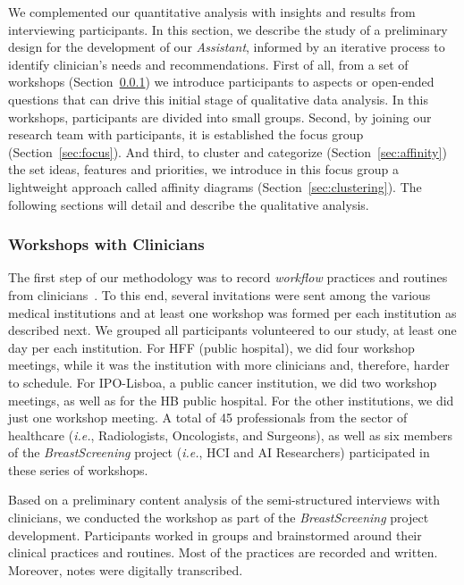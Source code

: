 We complemented our quantitative analysis with insights and results from interviewing participants.
In this section, we describe the study of a preliminary design for the development of our {\it Assistant}, informed by an iterative process to identify clinician's needs and recommendations.
First of all, from a set of workshops (Section~\ref{sec:workshops}) we introduce participants to aspects or open-ended questions that can drive this initial stage of qualitative data analysis.
In this workshops, participants are divided into small groups.
Second, by joining our research team with participants, it is established the focus group (Section~\ref{sec:focus}).
And third, to cluster and categorize (Section~\ref{sec:affinity}) the set ideas, features and priorities, we introduce in this focus group a lightweight approach called affinity diagrams (Section~\ref{sec:clustering}).
The following sections will detail and describe the qualitative analysis.

\subsubsection{Workshops with Clinicians}
\label{sec:workshops}

The first step of our methodology was to record {\it workflow} practices and routines from clinicians~\cite{Hoiseth:2013:DHG:2485760.2485770, Hoiseth:2013:RGD:2468356.2468436}.
To this end, several invitations were sent among the various medical institutions and at least one workshop was formed per each institution as described next.
We grouped all participants volunteered to our study, at least one day per each institution.
For HFF (public hospital), we did four workshop meetings, while it was the institution with more clinicians and, therefore, harder to schedule.
For IPO-Lisboa, a public cancer institution, we did two workshop meetings, as well as for the HB public hospital.
For the other institutions, we did just one workshop meeting.
A total of 45 professionals from the sector of healthcare ({\it i.e.}, Radiologists, Oncologists, and Surgeons), as well as six members of the {\it BreastScreening} project ({\it i.e.}, HCI and AI Researchers) participated in these series of workshops.

Based on a preliminary content analysis of the semi-structured interviews with clinicians, we conducted the workshop as part of the {\it BreastScreening} project development.
Participants worked in groups and brainstormed around their clinical practices and routines.
Most of the practices are recorded and written.
Moreover, notes were digitally transcribed.\footnotemark[15]

